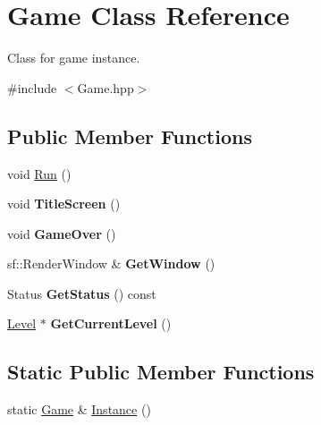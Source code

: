 \hypertarget{class_game}{}\section{Game Class Reference}
\label{class_game}


Class for game instance.  




{\ttfamily \#include $<$Game.\+hpp$>$}

\subsection*{Public Member Functions}
\begin{DoxyCompactItemize}
\item 
void \mbox{\hyperlink{class_game_a96341ca5b54d90adc3ecb3bf0bcd2312}{Run}} ()
\item 
\mbox{\label{class_game_a01a944d087a3af80bab84016d5792f36}} 
void {\bfseries Title\+Screen} ()
\item 
\mbox{\label{class_game_aeef0f3e9e8d8f2efeb75c10e1dda4ef2}} 
void {\bfseries Game\+Over} ()
\item 
\mbox{\label{class_game_ad7ed2e57852504912ee3b7352ab17178}} 
sf\+::\+Render\+Window \& {\bfseries Get\+Window} ()
\item 
\mbox{\label{class_game_acab123b8d50f20a35d4810749dab5188}} 
Status {\bfseries Get\+Status} () const
\item 
\mbox{\label{class_game_ab9f78b8e0b69bdfedf3041988e6d4407}} 
\mbox{\hyperlink{class_level}{Level}} $\ast$ {\bfseries Get\+Current\+Level} ()
\end{DoxyCompactItemize}
\subsection*{Static Public Member Functions}
\begin{DoxyCompactItemize}
\item 
static \mbox{\hyperlink{class_game}{Game}} \& \mbox{\hyperlink{class_game_a387b06ed773b24ebb05126001614d4bc}{Instance}} ()
\end{DoxyCompactItemize}
